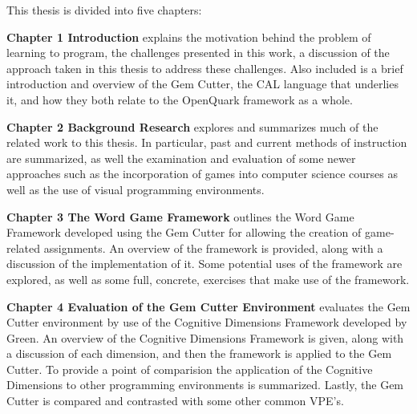 This thesis is divided into five chapters:


\textbf{Chapter 1 Introduction} explains the motivation behind the problem of learning to program, the challenges presented in this work, a discussion of the approach taken in this thesis to address these challenges.  Also included is a brief introduction and overview of the Gem Cutter, the CAL language that underlies it, and how they both relate to the OpenQuark framework as a whole.


\textbf{Chapter 2 Background Research} explores and summarizes much of the related work to this thesis.  In particular, past and current methods of instruction are summarized, as well the examination and evaluation of some newer approaches such as the incorporation of games into computer science courses as well as the use of visual programming environments.

	
\textbf{Chapter 3 The Word Game Framework} outlines the Word Game Framework developed using the Gem Cutter for allowing the creation of game-related assignments.  An overview of the framework is provided, along with a discussion of the implementation of it.  Some potential uses of the framework are explored, as well as some full, concrete, exercises that make use of the framework.


\textbf{Chapter 4 Evaluation of the Gem Cutter Environment} evaluates the Gem Cutter environment by use of the Cognitive Dimensions Framework developed by Green.  An overview of the Cognitive Dimensions Framework is given, along with a discussion of each dimension, and then the framework is applied to the Gem Cutter.  To provide a point of comparision the application of the Cognitive Dimensions to other programming environments is summarized.  Lastly, the Gem Cutter is compared and contrasted with some other common VPE's.

